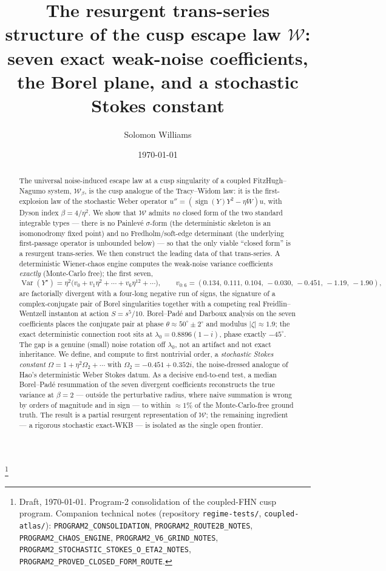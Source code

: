 \documentclass[11pt,reqno]{amsart}
\theoremstyle{plain}
\theoremstyle{definition}
\theoremstyle{remark}
\newcommand{\W}{\mathcal{W}}
\newcommand{\lz}{\lambda_0}
\DeclareMathOperator{\Var}{Var}
\begin{document}
\title[Resurgent structure of the cusp edge law]{The resurgent trans-series structure of the
cusp escape law $\mathcal W$: seven exact weak-noise coefficients, the Borel plane, and a
stochastic Stokes constant}
\author{Solomon Williams}
\address{School of Mathematics, University of Edinburgh, Edinburgh EH9 3FD, United Kingdom}
\thanks{Draft, \today. Program-2 consolidation of the coupled-FHN cusp program.
Companion technical notes (repository \texttt{regime-tests/}, \texttt{coupled-atlas/}):
\texttt{PROGRAM2\_CONSOLIDATION}, \texttt{PROGRAM2\_ROUTE2B\_NOTES},
\texttt{PROGRAM2\_CHAOS\_ENGINE}, \texttt{PROGRAM2\_V6\_GRIND\_NOTES},
\texttt{PROGRAM2\_STOCHASTIC\_STOKES\_O\_ETA2\_NOTES}, \texttt{PROGRAM2\_PROVED\_CLOSED\_FORM\_ROUTE}.}
\date{\today}

\begin{abstract}
The universal noise-induced escape law at a cusp singularity of a coupled FitzHugh--Nagumo
system, $\W_\beta$, is the cusp analogue of the Tracy--Widom law: it is the first-explosion
law of the stochastic Weber operator $u''=(\operatorname{sign}(Y)Y^2-\eta\dot W)u$, with Dyson
index $\beta=4/\eta^2$. We show that $\W$ admits \emph{no} closed form of the two standard
integrable types --- there is no Painlev\'e $\sigma$-form (the deterministic skeleton is an
isomonodromy fixed point) and no Fredholm/soft-edge determinant (the underlying first-passage
operator is unbounded below) --- so that the only viable ``closed form'' is a resurgent
trans-series. We then construct the leading data of that trans-series. A deterministic
Wiener-chaos engine computes the weak-noise variance coefficients \emph{exactly} (Monte-Carlo
free); the first seven,
\[
\Var(Y^\star)=\eta^2\bigl(v_0+v_1\eta^2+\cdots+v_6\eta^{12}+\cdots\bigr),\qquad
v_{0:6}=(0.134,\,0.111,\,0.104,\,-0.030,\,-0.451,\,-1.19,\,-1.90),
\]
are factorially divergent with a four-long negative run of signs, the signature of a
complex-conjugate pair of Borel singularities together with a competing real
Freidlin--Wentzell instanton at action $S=s^5/10$. Borel--Pad\'e and Darboux analysis on the
seven coefficients places the conjugate pair at phase $\theta\approx 50^\circ\pm2^\circ$ and
modulus $|\zeta|\approx1.9$; the exact deterministic connection root sits at
$\lz=0.8896(1-i)$, phase exactly $-45^\circ$. The gap is a genuine (small) noise rotation off
$\lz$, not an artifact and not exact inheritance. We define, and compute to first
nontrivial order, a \emph{stochastic Stokes constant} $\Omega=1+\eta^2\Omega_2+\cdots$ with
$\Omega_2=-0.451+0.352i$, the noise-dressed analogue of Hao's deterministic Weber Stokes datum.
As a decisive end-to-end test, a median Borel--Pad\'e resummation of the seven divergent
coefficients reconstructs the true variance at $\beta=2$ --- outside the perturbative radius,
where naive summation is wrong by orders of magnitude and in sign --- to within $\approx1\%$ of
the Monte-Carlo-free ground truth. The result is a partial resurgent representation of $\W$; the
remaining ingredient --- a rigorous stochastic exact-WKB --- is isolated as the single open
frontier.
\end{abstract}
\end{document}
